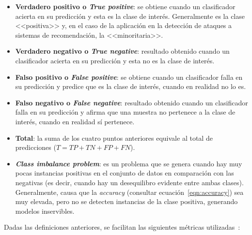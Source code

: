 \begin{itemize}
	\item \textbf{Verdadero positivo o \textit{True positive}}: se obtiene cuando un clasificador acierta en su predicción y esta es la clase de interés. Generalmente es la clase <<positiva>> y, en el caso de la aplicación en la detección de ataques a sistemas de recomendación, la <<minoritaria>>.
	\item \textbf{Verdadero negativo o \textit{True negative}}: resultado obtenido cuando un clasificador acierta en su predicción y esta no es la clase de interés.
	\item \textbf{Falso positivo o \textit{False positive}}: se obtiene cuando un clasificador falla en su predicción y predice que es la clase de interés, cuando en realidad no lo es.
	\item \textbf{Falso negativo o \textit{False negative}}: resultado obtenido cuando un clasificador falla en su predicción y afirma que una muestra no pertenece a la clase de interés, cuando en realidad sí pertenece.
	
	\item \textbf{Total}: la suma de los cuatro puntos anteriores equivale al total de predicciones ($T = TP + TN + FP + FN$).
	\item \textbf{\textit{Class imbalance problem}}: es un problema que se genera cuando hay muy pocas instancias positivas en el conjunto de datos en comparación con las negativas (es decir, cuando hay un desequilibro evidente entre ambas clases). Generalmente, causa que la \textit{accuracy} (consultar ecuación~\ref{eqn:accuracy}) sea muy elevada, pero no se detecten instancias de la clase positiva, generando modelos inservibles.
\end{itemize}

Dadas las definiciones anteriores, se facilitan las siguientes métricas utilizadas~\cite{apuntesSisint}:


